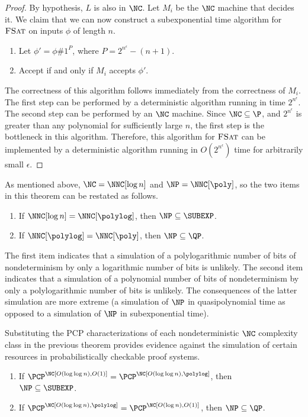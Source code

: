 \begin{proof}
  By hypothesis, $L$ is also in $\NC$.
  Let $M_i$ be the $\NC$ machine that decides it.
  We claim that we can now construct a subexponential time algorithm for $\textsc{FSat}$ on inputs $\phi$ of length $n$.
  \begin{enumerate}
  \item Let $\phi' = \phi \# 1^P$, where $P = 2^{n^\epsilon} - (n + 1)$.
  \item Accept if and only if $M_i$ accepts $\phi'$.
  \end{enumerate}
  The correctness of this algorithm follows immediately from the correctness of $M_i$.
  The first step can be performed by a deterministic algorithm running in time $2^{n^\epsilon}$.
  The second step can be performed by an $\NC$ machine.
  Since $\NC \subseteq \P$, and $2^{n^\epsilon}$ is greater than any polynomial for sufficiently large $n$, the first step is the bottleneck in this algorithm.
  Therefore, this algorithm for $\textsc{FSat}$ can be implemented by a deterministic algorithm running in $O(2^{n^\epsilon})$ time for arbitrarily small $\epsilon$.
\end{proof}

As mentioned above, $\NC = \NNC[\log n]$ and $\NP = \NNC[\poly]$, so the two items in this theorem can be restated as follows.
\begin{enumerate}
\item If $\NNC[\log n] = \NNC[\polylog]$, then $\NP \subseteq \SUBEXP$.
\item If $\NNC[\polylog] = \NNC[\poly]$, then $\NP \subseteq \QP$.
\end{enumerate}
The first item indicates that a simulation of a polylogarithmic number of bits of nondeterminism by only a logarithmic number of bits is unlikely.
The second item indicates that a simulation of a polynomial number of bits of nondeterminism by only a polylogarithmic number of bits is unlikely.
The consequences of the latter simulation are more extreme (a simulation of $\NP$ in quasipolynomial time as opposed to a simulation of $\NP$ in subexponential time).

Substituting the PCP characterizations of each nondeterministic $\NC$ complexity class in the previous theorem provides evidence against the simulation of certain resources in probabilistically checkable proof systems.

\begin{corollary}
  \mbox{}
  \begin{enumerate}
  \item If $\PCP^\NC[O(\loglog n), O(1)] = \PCP^\NC[O(\loglog n), \polylog]$, then \\ $\NP \subseteq \SUBEXP$.
  \item If $\PCP^\NC[O(\loglog n), \polylog] = \PCP^\NC[O(\log n), O(1)]$, then $\NP \subseteq \QP$.
  \end{enumerate}
\end{corollary}

